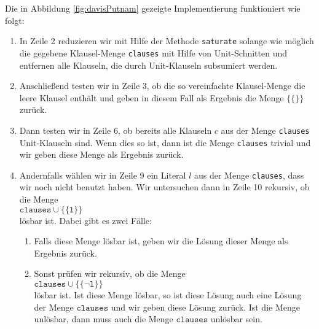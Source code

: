 Die in Abbildung \ref{fig:davisPutnam} gezeigte Implementierung funktioniert wie folgt:
\begin{enumerate}
\item In Zeile 2 reduzieren wir mit Hilfe der Methode \texttt{saturate} 
      solange wie m\"{o}glich die gegebene Klausel-Menge \texttt{clauses} mit Hilfe
      von Unit-Schnitten und entfernen alle Klauseln, die durch Unit-Klauseln
      subsumiert werden.
\item Anschlie\ss{}end testen wir in Zeile 3, ob die so vereinfachte Klausel-Menge
      die leere Klausel enth\"{a}lt und geben in diesem Fall als Ergebnis die Menge 
      $\bigl\{\{\}\bigr\}$ zur\"{u}ck.
\item Dann testen wir in Zeile 6, ob bereits alle Klauseln $c$ aus der Menge
      \texttt{clauses} Unit-Klauseln sind.  Wenn dies so ist,
      dann ist die Menge \texttt{clauses} trivial und wir geben diese Menge als Ergebnis zur\"{u}ck.
\item Andernfalls w\"{a}hlen wir in Zeile 9 ein Literal $l$ aus der Menge \texttt{clauses}, 
      dass wir noch nicht benutzt haben.
      Wir untersuchen dann in Zeile 10 rekursiv, ob die Menge \\[0.2cm]
      \hspace*{1.3cm} 
      $\mathtt{clauses} \cup \bigl\{\{\mathtt{l}\}\bigr\}$ 
      \\[0.2cm]
      l\"{o}sbar ist.  Dabei gibt es zwei F\"{a}lle:
      \begin{enumerate}
      \item Falls diese Menge l\"{o}sbar ist, geben wir die L\"{o}sung dieser Menge als Ergebnis zur\"{u}ck.

      \item Sonst  pr\"{u}fen wir rekursiv, ob die Menge 
            \\[0.2cm]
            \hspace*{1.3cm}
            $\mathtt{clauses} \cup \bigl\{ \{ \neg \mathtt{l}\} \bigr\}$ 
            \\[0.2cm]
            l\"{o}sbar ist.  Ist diese Menge l\"{o}sbar, so ist diese L\"{o}sung auch eine
            L\"{o}sung der Menge $\mathtt{clauses}$ und wir geben diese L\"{o}sung zur\"{u}ck.  Ist die
            Menge unl\"{o}sbar, dann muss auch die Menge $\mathtt{clauses}$ unl\"{o}sbar sein.
      \end{enumerate}
\end{enumerate}
